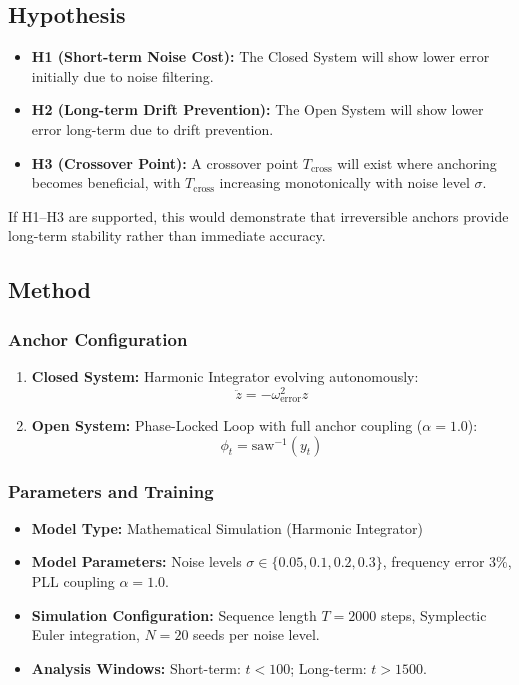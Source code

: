 \documentclass{article}
\begin{document}
\subsection{Hypothesis}
\begin{itemize}
    \item \textbf{H1 (Short-term Noise Cost):} The Closed System will show lower error initially due to noise filtering.
    \item \textbf{H2 (Long-term Drift Prevention):} The Open System will show lower error long-term due to drift prevention.
    \item \textbf{H3 (Crossover Point):} A crossover point $T_{\text{cross}}$ will exist where anchoring becomes beneficial, with $T_{\text{cross}}$ increasing monotonically with noise level $\sigma$.
\end{itemize}

If H1--H3 are supported, this would demonstrate that irreversible anchors provide long-term stability rather than immediate accuracy.

\subsection{Method}

\subsubsection{Anchor Configuration}
\begin{enumerate}
    \item \textbf{Closed System:} Harmonic Integrator evolving autonomously:
    \begin{equation}
        \ddot{z} = -\omega_{\text{error}}^2 z
    \end{equation}
    \item \textbf{Open System:} Phase-Locked Loop with full anchor coupling ($\alpha=1.0$):
    \begin{equation}
        \phi_t = \text{saw}^{-1}(y_t)
    \end{equation}
\end{enumerate}

\subsubsection{Parameters and Training}
\begin{itemize}
    \item \textbf{Model Type:} Mathematical Simulation (Harmonic Integrator)
    \item \textbf{Model Parameters:} Noise levels $\sigma \in \{0.05, 0.1, 0.2, 0.3\}$, frequency error $3\%$, PLL coupling $\alpha = 1.0$.
    \item \textbf{Simulation Configuration:} Sequence length $T=2000$ steps, Symplectic Euler integration, $N=20$ seeds per noise level.
    \item \textbf{Analysis Windows:} Short-term: $t < 100$; Long-term: $t > 1500$.
\end{itemize}
\end{document}
